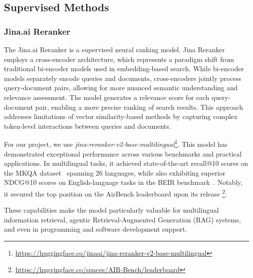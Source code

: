 \subsection{Supervised Methods}\label{subsec:supervised-methods}
\subsubsection{Jina.ai Reranker}
The Jina.ai Reranker is a supervised neural ranking model.
Jina Reranker employs a cross-encoder architecture, which represents a paradigm shift from traditional bi-encoder models used in embedding-based search.
While bi-encoder models separately encode queries and documents, cross-encoders jointly process query-document pairs, allowing for more nuanced semantic understanding and relevance assessment.
The model generates a relevance score for each query-document pair, enabling a more precise ranking of search results.
This approach addresses limitations of vector similarity-based methods by capturing complex token-level interactions between queries and documents.

For our project, we use \textit{jina-reranker-v2-base-multilingual}\footnote{\url{https://huggingface.co/jinaai/jina-reranker-v2-base-multilingual}}.
This model has demonstrated exceptional performance across various benchmarks and practical applications.
In multilingual tasks, it achieved state-of-the-art recall@10 scores on the MKQA dataset~\cite{mkqa} spanning 26 languages, while also exhibiting superior NDCG@10 scores on English-language tasks in the BEIR benchmark~\cite{thakur2021beirheterogenousbenchmarkzeroshot}.
Notably, it secured the top position on the AirBench leaderboard upon its release \footnote{\url{https://huggingface.co/spaces/AIR-Bench/leaderboard}}.

These capabilities make the model particularly valuable for multilingual information retrieval, agentic Retrieval-Augmented Generation (RAG) systems, and even in programming and software development support.
